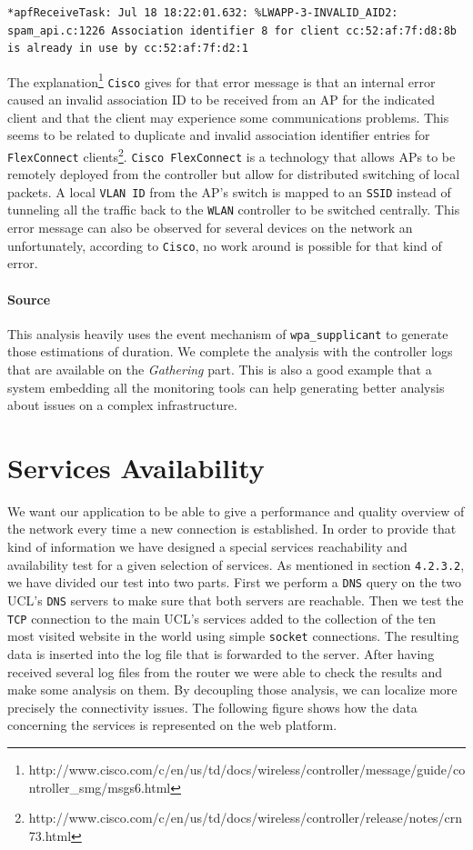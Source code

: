 \begin{lstlisting}[frame=single,breaklines=true,caption={\texttt{WiSM} association error message}]
*apfReceiveTask: Jul 18 18:22:01.632: %LWAPP-3-INVALID_AID2: spam_api.c:1226 Association identifier 8 for client cc:52:af:7f:d8:8b is already in use by cc:52:af:7f:d2:1
\end{lstlisting}

The explanation\footnote{http://www.cisco.com/c/en/us/td/docs/wireless/controller/message/guide/controller\_smg/msgs6.html} \texttt{Cisco} gives for that error message is that an internal error caused an invalid association ID to be received from an AP for the indicated client and that the client may experience some communications problems. This seems to be related to duplicate and invalid association identifier entries for \texttt{FlexConnect} clients\footnote{http://www.cisco.com/c/en/us/td/docs/wireless/controller/release/notes/crn73.html}. \texttt{Cisco FlexConnect} is a technology that allows APs to be remotely deployed from the controller but allow for distributed switching of local packets. A local \texttt{VLAN ID} from the AP's switch is mapped to an \texttt{SSID} instead of tunneling all the traffic back to the \texttt{WLAN} controller to be switched centrally. This error message can also be observed for several devices on the network an unfortunately, according to \texttt{Cisco}, no work around is possible for that kind of error.


\paragraph*{Source} This analysis heavily uses the event mechanism of \texttt{wpa\_supplicant} to generate those estimations of duration. We complete the analysis with the controller logs that are available on the \emph{Gathering} part. This is also a good example that a system embedding all the monitoring tools can help generating better analysis about issues on a complex infrastructure.


\section{Services Availability}
We want our application to be able to give a performance and quality overview of the network every time a new connection is established. In order to provide that kind of information we have designed a special services reachability and availability test for a given selection of services. As mentioned in section \texttt{4.2.3.2}, we have divided our test into two parts. First we perform a \texttt{DNS} query on the two UCL's \texttt{DNS} servers to make sure that both servers are reachable. Then we test the \texttt{TCP} connection to the main UCL's services added to the collection of the ten most visited website in the world using simple \texttt{socket} connections. The resulting data is inserted into the log file that is forwarded to the server. After having received several log files from the router we were able to check the results and make some analysis on them. By decoupling those analysis, we can localize more precisely the connectivity issues. The following figure shows how the data concerning the services is represented on the web platform.

